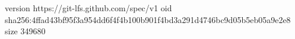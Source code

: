 version https://git-lfs.github.com/spec/v1
oid sha256:4ffad43bf95f3a954dd6f4f4b100b901f4bd3a291d4746bc9d05b5eb05a9e2e8
size 349680
